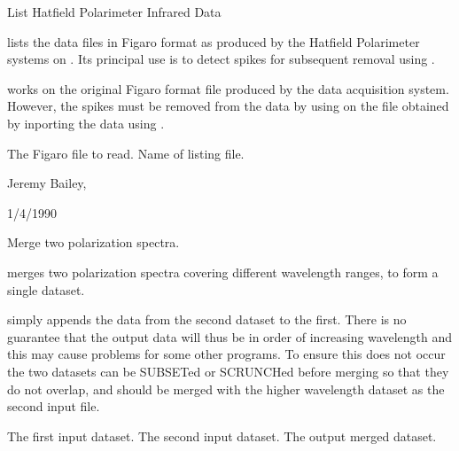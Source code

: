 \begin{manroutinedescription}
        List Hatfield Polarimeter Infrared Data

        {} lists the {} data files in Figaro format %
as produced
        by the Hatfield Polarimeter systems on {}. Its principal
        use is to detect spikes for subsequent removal using {}.

        {} works on the original Figaro format file produced by %
the
        data acquisition system. However, the spikes must be removed from
        the data by using {} on the {} file obtained %
by inporting the
        data using {}.

\begin{manparametertable}
     The {} Figaro %
file to read.
      Name of listing file.

\end{manparametertable}
         Jeremy Bailey, {}

         1/4/1990

\end{manroutinedescription}
\begin{manroutinedescription}
        Merge two polarization spectra.

        {} merges two polarization spectra covering different %
wavelength
        ranges, to form a single dataset.

        {} simply appends the data from the second dataset to %
the first.
        There is no guarantee that the output data will thus be in order
        of increasing wavelength and this may cause problems for some other
        programs. To ensure this does not occur the two datasets can be
        SUBSETed or SCRUNCHed before merging so that they do not overlap,
        and should be merged with the higher wavelength dataset as the
        second input file.

\begin{manparametertable}
  The %
first input dataset.
  The %
second input dataset.
  The %
output merged dataset.

\end{manparametertable}
\end{manroutinedescription}
